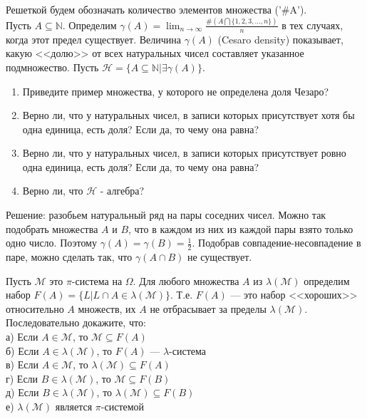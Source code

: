 \begin{problem}
Решеткой будем обозначать количество элементов множества ('\#A').\\
Пусть $A \subseteq \mathbb{N}$. Определим
$\gamma(A)=\lim_{n\rightarrow \infty}\frac{\#(A\bigcap
\{1,2,3,\ldots,n\})}{n}$ в тех случаях, когда этот предел существует.
Величина $\gamma(A)$ (Cesaro density) показывает, какую <<долю>> от
всех натуральных чисел составляет указанное подмножество. Пусть
$\mathcal{H}=\{A\subseteq \mathbb{N}|\exists \gamma(A)\}$. 

\begin{enumerate}
\item Приведите пример множества, у которого не определена доля Чезаро?
\item Верно ли, что у натуральных чисел, в записи которых присутствует
хотя бы одна единица, есть доля? Если да, то чему она равна?
\item Верно ли, что у натуральных чисел, в записи которых присутствует
ровно одна единица, есть доля? Если да, то чему она равна?
\item Верно
ли, что $\mathcal{H}$ -
алгебра?
\end{enumerate}
 
\end{problem} 
\begin{solution} 

Решение: разобьем натуральный ряд на пары соседних чисел. Можно
так подобрать множества $A$ и $B$, что в каждом из них из каждой
пары взято только одно число. Поэтому
$\gamma(A)=\gamma(B)=\frac{1}{2}$. Подобрав
совпадение-несовпадение в паре, можно сделать так, что
$\gamma(A\cap B)$ не существует. 
\end{solution}

\begin{problem}
Пусть $\mathcal{M}$ это $\pi$-система на $\Omega$. Для любого
множества $A$ из $\lambda(\mathcal{M})$ определим набор
$F(A)=\{L|L\cap A \in \lambda(\mathcal{M})\}$. Т.е. $F(A)$ --- это
набор <<хороших>> относительно $A$ множеств, их $A$ не отбрасывает
за пределы $\lambda(\mathcal{M})$. \\
Последовательно докажите, что: \\
а) Если $A \in \mathcal{M}$, то $\mathcal{M}\subseteq F(A)$ \\
б) Если $A\in\lambda(\mathcal{M})$, то $F(A)$ --- $\lambda$-система \\
в) Если $A \in \mathcal{M}$, то $\lambda(\mathcal{M})\subseteq
F(A)$ \\
г) Если $B\in \lambda(\mathcal{M})$, то $\mathcal{M}\subseteq
F(B)$ \\
д) Если $B\in \lambda(\mathcal{M})$, то
$\lambda(\mathcal{M})\subseteq
F(B)$ \\
е) $\lambda(\mathcal{M})$ является $\pi$-системой 
\end{problem} 
\begin{solution} 

\end{solution}

